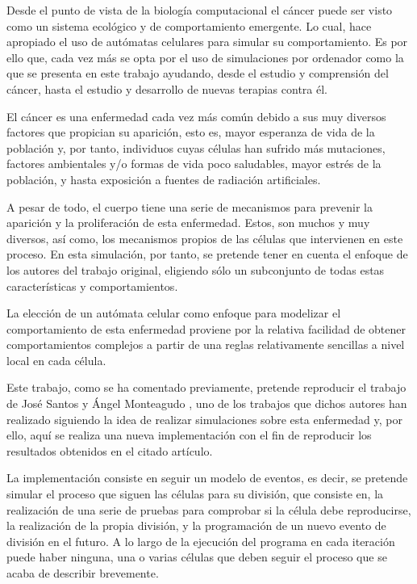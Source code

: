 Desde el punto de vista de la biología computacional el cáncer puede ser visto como un sistema ecológico y de comportamiento emergente.
Lo cual, hace apropiado el uso de autómatas celulares para simular su comportamiento. Es por ello que, cada vez más se opta por el uso
de simulaciones por ordenador como la que se presenta en este trabajo ayudando, desde el estudio y comprensión del cáncer, hasta
el estudio y desarrollo de nuevas terapias contra él.

El cáncer es una enfermedad cada vez más común debido a sus muy diversos factores que propician su aparición, esto es,
mayor esperanza de vida de la población y, por tanto, individuos cuyas células han sufrido más mutaciones, factores ambientales y/o
formas de vida poco saludables, mayor estrés de la población, y hasta exposición a fuentes de radiación artificiales.

A pesar de todo, el cuerpo tiene una serie de mecanismos para prevenir la aparición y la proliferación de esta enfermedad. Estos,
son muchos y muy diversos, así como, los mecanismos propios de las células que intervienen en este proceso. En esta simulación, por tanto,
se pretende tener en cuenta el enfoque de los autores del trabajo original, eligiendo sólo un subconjunto de todas estas
características y comportamientos.

La elección de un autómata celular como enfoque para modelizar el comportamiento de esta enfermedad proviene por la relativa
facilidad de obtener comportamientos complejos a partir de una reglas relativamente sencillas a nivel local en cada célula.

Este trabajo, como se ha comentado previamente, pretende reproducir el trabajo de José Santos y Ángel Monteagudo \cite{jsantos-amonteagudo-1-2014},
uno de los trabajos \cite{jsantos-amonteagudo-2012} \cite{jsantos-amonteagudo-2013} \cite{jsantos-amonteagudo-2015} que dichos autores han realizado siguiendo la idea de realizar simulaciones sobre esta enfermedad y, por ello, aquí
se realiza una nueva implementación con el fin de reproducir los resultados obtenidos en el citado artículo.

\newpage

La implementación consiste en seguir un modelo de eventos, es decir, se pretende simular el proceso que siguen las células para su división, que
consiste en, la realización de una serie de pruebas para comprobar si la célula debe reproducirse, la realización de la propia división, y
la programación de un nuevo evento de división en el futuro. A lo largo de la ejecución del programa en cada iteración puede haber ninguna, una o
varias células que deben seguir el proceso que se acaba de describir brevemente.

